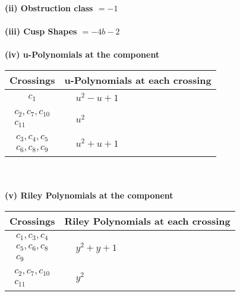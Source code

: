 \documentclass[1p]{elsarticle_modified}
\theoremstyle{definition}
\begin{document}
\flushleft \textbf{(ii) Obstruction class $= -1$}\\~\\
\flushleft \textbf{(iii) Cusp Shapes $= -4 b-2$}\\~\\
\newpage\renewcommand{\arraystretch}{1}
\flushleft \textbf{(iv) u-Polynomials at the component}\newline \\
\begin{tabular}{m{50pt}|m{274pt}}
Crossings & \hspace{64pt}u-Polynomials at each crossing \\
\hline $$\begin{aligned}c_{1}\end{aligned}$$&$\begin{aligned}
&u^2- u+1
\end{aligned}$\\
\hline $$\begin{aligned}c_{2},c_{7},c_{10}\\c_{11}\end{aligned}$$&$\begin{aligned}
&u^2
\end{aligned}$\\
\hline $$\begin{aligned}c_{3},c_{4},c_{5}\\c_{6},c_{8},c_{9}\end{aligned}$$&$\begin{aligned}
&u^2+u+1
\end{aligned}$\\
\hline
\end{tabular}\\~\\
\newpage\renewcommand{\arraystretch}{1}
\flushleft \textbf{(v) Riley Polynomials at the component}\newline \\
\begin{tabular}{m{50pt}|m{274pt}}
Crossings & \hspace{64pt}Riley Polynomials at each crossing \\
\hline $$\begin{aligned}c_{1},c_{3},c_{4}\\c_{5},c_{6},c_{8}\\c_{9}\end{aligned}$$&$\begin{aligned}
&y^2+y+1
\end{aligned}$\\
\hline $$\begin{aligned}c_{2},c_{7},c_{10}\\c_{11}\end{aligned}$$&$\begin{aligned}
&y^2
\end{aligned}$\\
\hline
\end{tabular}\\~\\
\end{document}
